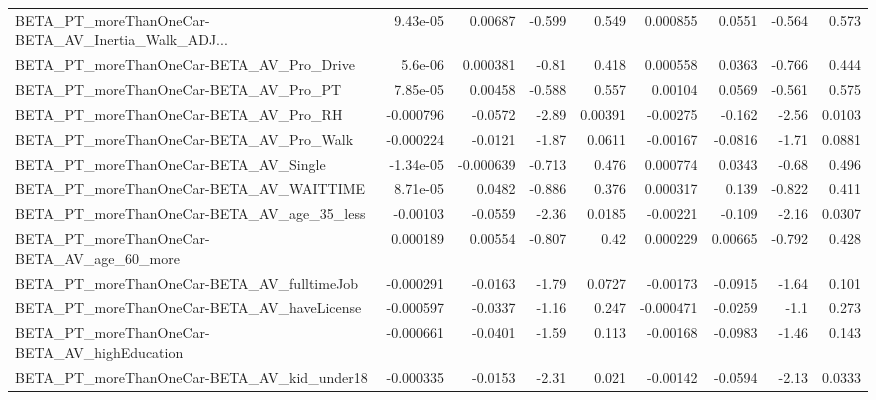 \begin{tabular}{lrrrrrrrr}
BETA\_PT\_moreThanOneCar-BETA\_AV\_Inertia\_Walk\_ADJ... &    9.43e-05 &      0.00687 &   -0.599 &    0.549 &   0.000855 &      0.0551 &       -0.564 &         0.573 \\
BETA\_PT\_moreThanOneCar-BETA\_AV\_Pro\_Drive           &     5.6e-06 &     0.000381 &    -0.81 &    0.418 &   0.000558 &      0.0363 &       -0.766 &         0.444 \\
BETA\_PT\_moreThanOneCar-BETA\_AV\_Pro\_PT              &    7.85e-05 &      0.00458 &   -0.588 &    0.557 &    0.00104 &      0.0569 &       -0.561 &         0.575 \\
BETA\_PT\_moreThanOneCar-BETA\_AV\_Pro\_RH              &   -0.000796 &      -0.0572 &    -2.89 &  0.00391 &   -0.00275 &      -0.162 &        -2.56 &        0.0103 \\
BETA\_PT\_moreThanOneCar-BETA\_AV\_Pro\_Walk            &   -0.000224 &      -0.0121 &    -1.87 &   0.0611 &   -0.00167 &     -0.0816 &        -1.71 &        0.0881 \\
BETA\_PT\_moreThanOneCar-BETA\_AV\_Single              &   -1.34e-05 &    -0.000639 &   -0.713 &    0.476 &   0.000774 &      0.0343 &        -0.68 &         0.496 \\
BETA\_PT\_moreThanOneCar-BETA\_AV\_WAITTIME            &    8.71e-05 &       0.0482 &   -0.886 &    0.376 &   0.000317 &       0.139 &       -0.822 &         0.411 \\
BETA\_PT\_moreThanOneCar-BETA\_AV\_age\_35\_less         &    -0.00103 &      -0.0559 &    -2.36 &   0.0185 &   -0.00221 &      -0.109 &        -2.16 &        0.0307 \\
BETA\_PT\_moreThanOneCar-BETA\_AV\_age\_60\_more         &    0.000189 &      0.00554 &   -0.807 &     0.42 &   0.000229 &     0.00665 &       -0.792 &         0.428 \\
BETA\_PT\_moreThanOneCar-BETA\_AV\_fulltimeJob         &   -0.000291 &      -0.0163 &    -1.79 &   0.0727 &   -0.00173 &     -0.0915 &        -1.64 &         0.101 \\
BETA\_PT\_moreThanOneCar-BETA\_AV\_haveLicense         &   -0.000597 &      -0.0337 &    -1.16 &    0.247 &  -0.000471 &     -0.0259 &         -1.1 &         0.273 \\
BETA\_PT\_moreThanOneCar-BETA\_AV\_highEducation       &   -0.000661 &      -0.0401 &    -1.59 &    0.113 &   -0.00168 &     -0.0983 &        -1.46 &         0.143 \\
BETA\_PT\_moreThanOneCar-BETA\_AV\_kid\_under18         &   -0.000335 &      -0.0153 &    -2.31 &    0.021 &   -0.00142 &     -0.0594 &        -2.13 &        0.0333 \\

\end{tabular}
